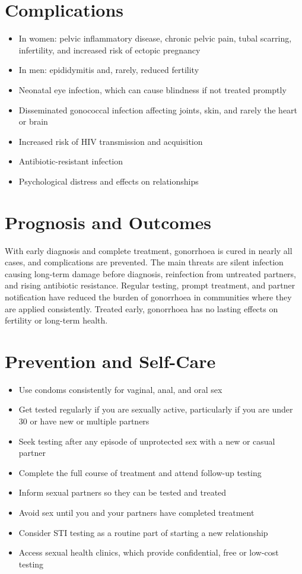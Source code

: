 \section*{Complications}
\begin{itemize}
    \item In women: pelvic inflammatory disease, chronic pelvic pain, tubal scarring, infertility, and increased risk of ectopic pregnancy
    \item In men: epididymitis and, rarely, reduced fertility
    \item Neonatal eye infection, which can cause blindness if not treated promptly
    \item Disseminated gonococcal infection affecting joints, skin, and rarely the heart or brain
    \item Increased risk of HIV transmission and acquisition
    \item Antibiotic-resistant infection
    \item Psychological distress and effects on relationships
\end{itemize}

\section*{Prognosis and Outcomes}
With early diagnosis and complete treatment, gonorrhoea is cured in nearly all cases, and complications are prevented. The main threats are silent infection causing long-term damage before diagnosis, reinfection from untreated partners, and rising antibiotic resistance. Regular testing, prompt treatment, and partner notification have reduced the burden of gonorrhoea in communities where they are applied consistently. Treated early, gonorrhoea has no lasting effects on fertility or long-term health.

\section*{Prevention and Self-Care}
\begin{itemize}
    \item Use condoms consistently for vaginal, anal, and oral sex
    \item Get tested regularly if you are sexually active, particularly if you are under 30 or have new or multiple partners
    \item Seek testing after any episode of unprotected sex with a new or casual partner
    \item Complete the full course of treatment and attend follow-up testing
    \item Inform sexual partners so they can be tested and treated
    \item Avoid sex until you and your partners have completed treatment
    \item Consider STI testing as a routine part of starting a new relationship
    \item Access sexual health clinics, which provide confidential, free or low-cost testing
\end{itemize}

